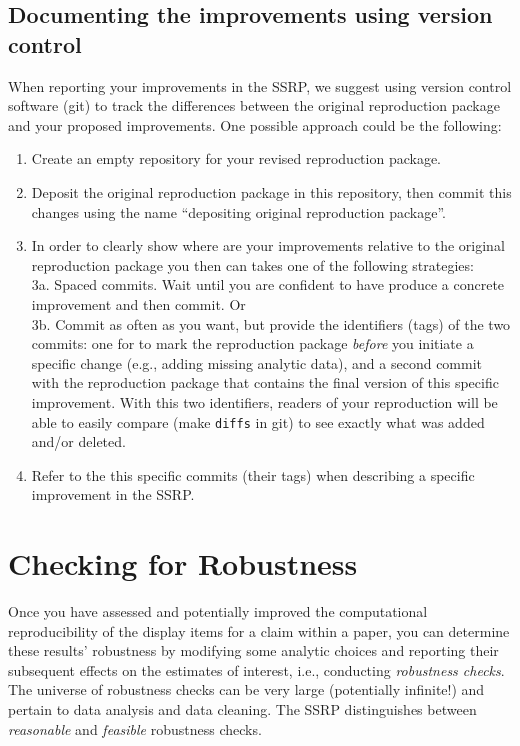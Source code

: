 \documentclass[
]{book}
\providecommand{\tightlist}{%
  \setlength{\itemsep}{0pt}\setlength{\parskip}{0pt}}
\begin{document}
\hypertarget{doc-impr}{%
\section{Documenting the improvements using version control}\label{doc-impr}}

When reporting your improvements in the SSRP, we suggest using version control software (git) to track the differences between the original reproduction package and your proposed improvements. One possible approach could be the following:

\begin{enumerate}
\def\labelenumi{\arabic{enumi}.}
\tightlist
\item
  Create an empty repository for your revised reproduction package.
\item
  Deposit the original reproduction package in this repository, then commit this changes using the name ``depositing original reproduction package''.\\
\item
  In order to clearly show where are your improvements relative to the original reproduction package you then can takes one of the following strategies:\\
  3a. Spaced commits. Wait until you are confident to have produce a concrete improvement and then commit. Or\\
  3b. Commit as often as you want, but provide the identifiers (tags) of the two commits: one for to mark the reproduction package \emph{before} you initiate a specific change (e.g., adding missing analytic data), and a second commit with the reproduction package that contains the final version of this specific improvement. With this two identifiers, readers of your reproduction will be able to easily compare (make \texttt{diffs} in git) to see exactly what was added and/or deleted.\\
\item
  Refer to the this specific commits (their tags) when describing a specific improvement in the SSRP.
\end{enumerate}

\hypertarget{robust}{%
\chapter{Checking for Robustness}\label{robust}}

Once you have assessed and potentially improved the computational reproducibility of the display items for a claim within a paper, you can determine these results' robustness by modifying some analytic choices and reporting their subsequent effects on the estimates of interest, i.e., conducting \emph{robustness checks}. The universe of robustness checks can be very large (potentially infinite!) and pertain to data analysis and data cleaning. The SSRP distinguishes between \emph{reasonable} and \emph{feasible} robustness checks.
\end{document}
